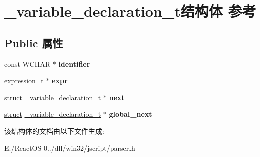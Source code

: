 \hypertarget{struct__variable__declaration__t}{}\section{\+\_\+variable\+\_\+declaration\+\_\+t结构体 参考}
\label{struct__variable__declaration__t}
\subsection*{Public 属性}
\begin{DoxyCompactItemize}
\item 
\mbox{\label{struct__variable__declaration__t_a277c3f0eac9ec6abf71461c92158bbb4}} 
const W\+C\+H\+AR $\ast$ {\bfseries identifier}
\item 
\mbox{\label{struct__variable__declaration__t_a4d6516888f5f5dda49c407ebbe46d870}} 
\hyperlink{struct__expression__t}{expression\+\_\+t} $\ast$ {\bfseries expr}
\item 
\mbox{\label{struct__variable__declaration__t_ab2e4734196bc59a0e75a693586bf85eb}} 
\hyperlink{interfacestruct}{struct} \hyperlink{struct__variable__declaration__t}{\+\_\+variable\+\_\+declaration\+\_\+t} $\ast$ {\bfseries next}
\item 
\mbox{\label{struct__variable__declaration__t_a345a4712b6ee8e204ae28af54c02ac02}} 
\hyperlink{interfacestruct}{struct} \hyperlink{struct__variable__declaration__t}{\+\_\+variable\+\_\+declaration\+\_\+t} $\ast$ {\bfseries global\+\_\+next}
\end{DoxyCompactItemize}


该结构体的文档由以下文件生成\+:\begin{DoxyCompactItemize}
\item 
E\+:/\+React\+O\+S-\/0../dll/win32/jscript/parser.\+h\end{DoxyCompactItemize}
